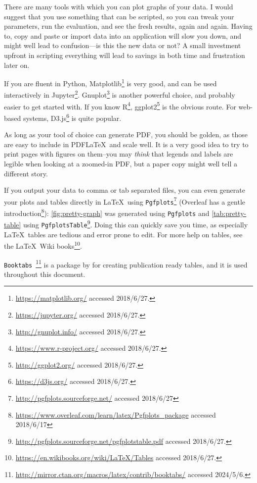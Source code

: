 There are many tools with which you can plot graphs of your data. I would
suggest that you use something that can be scripted, so you can tweak your
parameters, run the evaluation, and see the fresh results, again and
again. Having to, \eg copy and paste or import data into an application will
slow you down, and might well lead to confusion---is this the new data or not?
A small investment upfront in scripting everything will lead to savings in
both time and frustration later on.

If you are fluent in Python,
Matplotlib\footnote{\url{https://matplotlib.org/} accessed 2018/6/27.} is
very good, and can be used interactively in
Jupyter\footnote{\url{https://jupyter.org/} accessed
  2018/6/27.}. Gnuplot\footnote{\url{http://gnuplot.info/} accessed
  2018/6/27.}  is another powerful choice, and probably easier to get
started with. If you know R\footnote{\url{https://www.r-project.org/}
  accessed 2018/6/27.}, ggplot2\footnote{\url{http://ggplot2.org/} accessed
  2018/6/27.} is the obvious route.  For web-based systems,
D3.js\footnote{\url{https://d3js.org/} accessed 2018/6/27.} is quite
popular.

As long as your tool of choice can generate \acs{PDF}, you should be golden,
as those are easy to include in PDF\LaTeX\ and scale well. It is a very good
idea to try to print pages with figures on them--you may \emph{think} that
legends and labels are legible when looking at a zoomed-in \acs{PDF}, but a
paper copy might well tell a different story.

If you output your data to comma or tab separated files, you can even
generate your plots and tables directly in \LaTeX\ using
\texttt{Pgfplots}\footnote{\url{http://pgfplots.sourceforge.net/} accessed
  2018/6/27} (Overleaf has a gentle
introduction\footnote{\url{https://www.overleaf.com/learn/latex/Pgfplots_package}
  accessed 2018/6/17}): \autoref{fig:pretty-graph} was generated using
\texttt{Pgfplots} and \autoref{tab:pretty-table} using
\texttt{PgfplotsTable}\footnote{\url{http://pgfplots.sourceforge.net/pgfplotstable.pdf}
  accessed 2018/6/27.}.  Doing this can quickly save you time, as especially
\LaTeX\ tables are tedious and error prone to edit. For more help on tables,
see the \LaTeX\ Wiki
books\footnote{\url{https://en.wikibooks.org/wiki/LaTeX/Tables} accessed
  2018/6/27.}.

\texttt{Booktabs}~\cite{fear2005publication}\footnote{\url{http://mirror.ctan.org/macros/latex/contrib/booktabs/} accessed 2024/5/6.} is a package by \citeauthor{fear2005publication} for creating publication ready tables, and it is used throughout this document.


